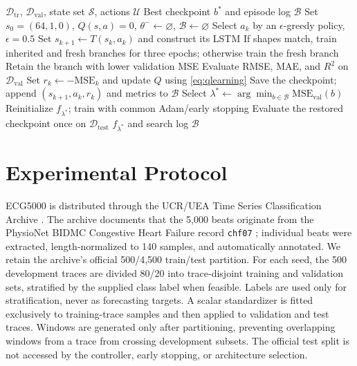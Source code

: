 \documentclass[conference]{IEEEtran}
\begin{document}
\begin{algorithm}[t]
\caption{Warm-Start Q-Learning for LSTM Configuration}
\label{alg:warmstart}
\footnotesize
\begin{algorithmic}[1]
\Require $\mathcal{D}_{\mathrm{tr}}$, $\mathcal{D}_{\mathrm{val}}$, state set $\mathcal{S}$, actions $\mathcal{U}$
\Ensure Best checkpoint $b^*$ and episode log $\mathcal{B}$
\State Set $s_0=(64,1,0)$, $Q(s,a)=0$, $\theta^-\gets\varnothing$, $\mathcal{B}\gets\varnothing$
    \State Select $a_k$ by an $\epsilon$-greedy policy, $\epsilon=0.5$
    \State Set $s_{k+1}\gets T(s_k,a_k)$ and construct its LSTM
    \State If shapes match, train inherited and fresh branches for three epochs; otherwise train the fresh branch
    \State Retain the branch with lower validation MSE
    \State Evaluate RMSE, MAE, and $R^2$ on $\mathcal{D}_{\mathrm{val}}$
    \State Set $r_k\gets-\mathrm{MSE}_k$ and update $Q$ using \eqref{eq:qlearning}
    \State Save the checkpoint; append $(s_{k+1},a_k,r_k)$ and metrics to $\mathcal{B}$
\EndFor
\State Select $\lambda^*\gets\arg\min_{b\in\mathcal{B}}\mathrm{MSE}_{\mathrm{val}}(b)$
\State Reinitialize $f_{\lambda^*}$; train with common Adam/early stopping
\State Evaluate the restored checkpoint once on $\mathcal{D}_{\mathrm{test}}$
\State \Return $f_{\lambda^*}$ and search log $\mathcal{B}$
\end{algorithmic}
\end{algorithm}

\section{Experimental Protocol}
ECG5000 is distributed through the UCR/UEA Time Series Classification Archive \cite{dau2019ucr,ecg5000zenodo2024}. The archive documents that the 5,000 beats originate from the PhysioNet BIDMC Congestive Heart Failure record \texttt{chf07} \cite{goldberger2000physiobank}; individual beats were extracted, length-normalized to 140 samples, and automatically annotated. We retain the archive's official 500/4,500 train/test partition. For each seed, the 500 development traces are divided 80/20 into trace-disjoint training and validation sets, stratified by the supplied class label when feasible. Labels are used only for stratification, never as forecasting targets. A scalar standardizer is fitted exclusively to training-trace samples and then applied to validation and test traces. Windows are generated only after partitioning, preventing overlapping windows from a trace from crossing development subsets. The official test split is not accessed by the controller, early stopping, or architecture selection.
\end{document}
